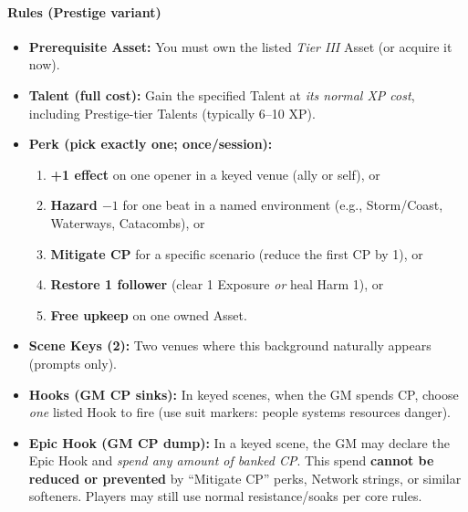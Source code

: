 \documentclass[11pt]{article}
\begin{document}
\paragraph{Rules (Prestige variant)}
\begin{itemize}
  \item \textbf{Prerequisite Asset:} You must own the listed \emph{Tier III} Asset (or acquire it now).
  \item \textbf{Talent (full cost):} Gain the specified Talent at \emph{its normal XP cost}, including Prestige-tier Talents (typically 6–10 XP).
  \item \textbf{Perk (pick exactly one; once/session):}
    \begin{enumerate}
      \item \textbf{+1 effect} on one opener in a keyed venue (ally or self), or
      \item \textbf{Hazard $-1$} for one beat in a named environment (e.g., Storm/Coast, Waterways, Catacombs), or
      \item \textbf{Mitigate CP} for a specific scenario (reduce the first CP by 1), or
      \item \textbf{Restore 1 follower} (clear 1 Exposure \emph{or} heal Harm 1), or
      \item \textbf{Free upkeep} on one owned Asset.
    \end{enumerate}
  \item \textbf{Scene Keys (2):} Two venues where this background naturally appears (prompts only).
  \item \textbf{Hooks (GM CP sinks):} In keyed scenes, when the GM spends CP, choose \emph{one} listed Hook to fire (use suit markers: \heartsuit people \quad \clubsuit systems \quad \diamondsuit resources \quad \spadesuit danger).
  \item \textbf{Epic Hook (GM CP dump):} In a keyed scene, the GM may declare the Epic Hook and \emph{spend any amount of banked CP}. This spend \textbf{cannot be reduced or prevented} by “Mitigate CP” perks, Network strings, or similar softeners. Players may still use normal resistance/soaks per core rules.
\end{itemize}

\end{document}
